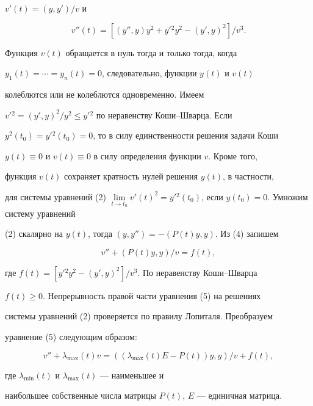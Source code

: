 $v'(t)=(y,y')/v$ и 


\begin{equation} 


v''(t)=[(y'',y)y^2+y'{}^2y^2-(y',y)^2]/v^3. 


\end{equation} 


Функция $v(t)$ обращается в нуль тогда и только тогда, когда 


$y_1(t)=\dotsb=y_n(t)=0$, следовательно, функции $y(t)$ и $v(t)$ 


колеблются или не колеблются одновременно. Имеем 


$v'{}^2=(y',y)^2/y^2\le y'{}^2$ по неравенству Коши--Шварца. Если 


$y^2(t_0)=y'{}^2(t_0)=0$, то в силу единственности решения задачи Коши 


$y(t)\equiv0$ и $v(t)\equiv0$ в силу определения функции $v$. Кроме того, 


функция $v(t)$ сохраняет кратность нулей решения $y(t)$, в частности,


для системы уравнений (2)\; $\lim\limits_{t\to 


t_0}v'(t)^2=y'{}^2(t_0)$, если $y(t_0)=0$. Умножим систему уравнений 


(2) скалярно на $y(t)$, тогда $(y,y'')=-(P(t)y,y)$. Из (4) запишем 


\begin{equation} 


v''+(P(t)y,y)/v=f(t), 


\end{equation} 


где $f(t)=[y'{}^2y^2-(y',y)^2]/v^3$. По неравенству Коши--Шварца 


$f(t)\ge0$. Непрерывность правой части уравнения (5) на решениях 


системы уравнений (2) проверяется по правилу Лопиталя. Преобразуем 


уравнение (5) следующим образом:


\begin{equation} 


v''+\lambda_{\max}(t)v=((\lambda_{\max}(t)E-P(t))y,y)/v 


+f(t), 


\end{equation} 


где $\lambda_{\min}(t)$ и $\lambda_{\max}(t)$ --- наименьшее и 


наибольшее собственные числа матрицы $P(t)$, $E$ --- единичная матрица. 


